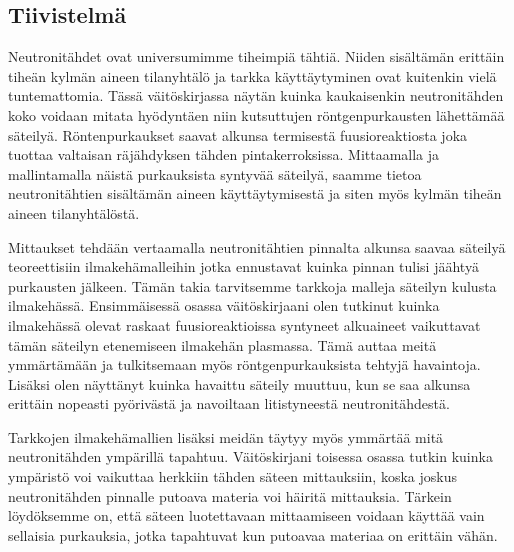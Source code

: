 
\begin{otherlanguage}{finnish}
\vspace{2.0cm}
\chapter*{Tiivistelmä}


Neutronitähdet ovat universumimme tiheimpiä tähtiä. 
Niiden sisältämän erittäin tiheän kylmän aineen tilanyhtälö ja tarkka käyttäytyminen ovat kuitenkin vielä tuntemattomia. 
Täs\-sä väi\-tös\-kirjassa näy\-tän kuinka kaukaisenkin neutronitäh\-den koko voidaan mitata hyö\-dyn\-tä\-en niin kutsuttujen rönt\-genpurkausten lähet\-tämää sä\-tei\-lyä. 
Röntenpurkaukset saavat alkunsa termisestä fuusioreaktiosta joka tuottaa valtaisan räjähdyksen tähden pintakerroksissa. 
Mittaamalla ja mallintamalla näistä purkauksista syntyvää säteilyä, saamme tietoa neutronitähtien sisältämän aineen käyttäytymisestä ja siten myös kylmän tiheän aineen tilanyhtälöstä.

Mittaukset tehdään vertaamalla neutronitähtien pinnalta alkunsa saavaa säteilyä teoreettisiin ilmakehämalleihin jotka ennustavat kuinka pinnan tulisi jääh\-tyä purkausten jäl\-keen. 
Tämän takia tarvitsemme tarkkoja malleja säteilyn kulusta ilmakehässä. 
En\-simmäi\-sessä osassa väi\-tös\-kir\-jaani olen tutkinut kuinka ilmakehässä olevat raskaat fuusioreaktioissa syntyneet alkuaineet vaikuttavat tämän säteilyn etenemiseen ilmakehän plasmassa. 
Tämä auttaa meitä ymmärtämään ja tulkitsemaan myös röntgenpurkauksista tehtyjä havaintoja. 
Lisäksi olen näyttänyt kuinka havaittu säteily muuttuu, kun se saa alkunsa erittäin nopeasti pyörivästä ja navoiltaan litistyneestä neutronitähdestä.

Tarkkojen ilmakehämallien lisäksi meidän täytyy myös ymmärtää mitä neutronitähden ympärillä tapahtuu. 
Väitöskirjani toisessa osassa tutkin kuinka ympäristö voi vaikuttaa herkkiin tähden säteen mittauksiin, koska joskus neutronitähden pinnalle putoava materia voi häiritä mittauksia. 
Tärkein löydöksemme on, että säteen luotettavaan mittaamiseen voidaan käyttää vain sellaisia purkauksia, jotka tapahtuvat kun putoavaa materiaa on erittäin vähän.


\end{otherlanguage}

